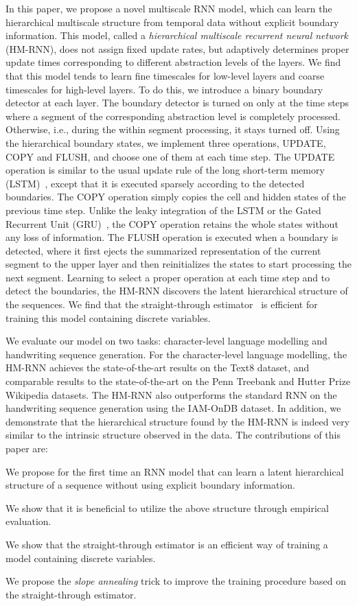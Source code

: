 In this paper, we propose a novel multiscale RNN model, which can learn the hierarchical multiscale structure from temporal data without explicit boundary information. This model, called a \textit{hierarchical multiscale recurrent neural network} (HM-RNN), does not assign fixed update rates, but adaptively determines proper update times corresponding to different abstraction levels of the layers. We find that this model tends to learn fine timescales for low-level layers and coarse timescales for high-level layers. To do this, we introduce a binary boundary detector at each layer. The boundary detector is turned on only at the time steps where a segment of the corresponding abstraction level is completely processed. Otherwise, i.e., during the within segment processing, it stays turned off. Using the hierarchical boundary states, we implement three operations, UPDATE, COPY and FLUSH, and choose one of them at each time step. The UPDATE operation is similar to the usual update rule of the long short-term memory (LSTM)~\citep{hochreiter1997long}, except that it is executed sparsely according to the detected boundaries. The COPY operation simply copies the cell and hidden states of the previous time step. Unlike the leaky integration of the LSTM or the Gated Recurrent Unit (GRU)~\citep{Cho-et-al-EMNLP2014}, the COPY operation retains the whole states without any loss of information. The FLUSH operation is executed when a boundary is detected, where it first ejects the summarized representation of the current segment to the upper layer and then reinitializes the states to start processing the next segment. Learning to select a proper operation at each time step and to detect the boundaries, the HM-RNN discovers the latent hierarchical structure of the sequences. We find that the straight-through estimator~\citep{hinton2012coursera,bengio2013estimating,courbariaux2016binarized} is efficient for training this model containing discrete variables.

We evaluate our model on two tasks: character-level language modelling and handwriting sequence generation. For the character-level language modelling, the HM-RNN achieves the state-of-the-art results on the Text8 dataset, and comparable results to the state-of-the-art on the Penn Treebank and Hutter Prize Wikipedia datasets. The HM-RNN also outperforms the standard RNN on the handwriting sequence generation using the IAM-OnDB dataset. In addition, we demonstrate that the hierarchical structure found by the HM-RNN is indeed very similar to the intrinsic structure observed in the data. The contributions of this paper are:
\bitem
    \item We propose for the first time an RNN model that can learn a latent hierarchical structure of a sequence without using explicit boundary information.
    \item We show that it is beneficial to utilize the above structure through empirical evaluation. 
	\item We show that the straight-through estimator is an efficient way of training a model containing discrete variables. 
    \item We propose the {\it slope annealing} trick to improve the training procedure based on the straight-through estimator.
\eitem

